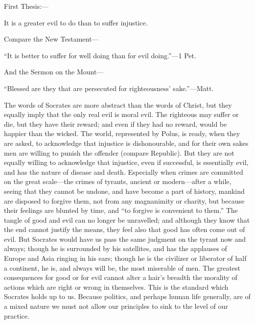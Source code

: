 \documentclass[11pt,letter]{article}
\begin{document}
\par  First Thesis:—

\par  It is a greater evil to do than to suffer injustice.

\par  Compare the New Testament—

\par  “It is better to suffer for well doing than for evil doing.”—1 Pet.

\par  And the Sermon on the Mount—

\par  “Blessed are they that are persecuted for righteousness’ sake.”—Matt.

\par  The words of Socrates are more abstract than the words of Christ, but they equally imply that the only real evil is moral evil. The righteous may suffer or die, but they have their reward; and even if they had no reward, would be happier than the wicked. The world, represented by Polus, is ready, when they are asked, to acknowledge that injustice is dishonourable, and for their own sakes men are willing to punish the offender (compare Republic). But they are not equally willing to acknowledge that injustice, even if successful, is essentially evil, and has the nature of disease and death. Especially when crimes are committed on the great scale—the crimes of tyrants, ancient or modern—after a while, seeing that they cannot be undone, and have become a part of history, mankind are disposed to forgive them, not from any magnanimity or charity, but because their feelings are blunted by time, and “to forgive is convenient to them.” The tangle of good and evil can no longer be unravelled; and although they know that the end cannot justify the means, they feel also that good has often come out of evil. But Socrates would have us pass the same judgment on the tyrant now and always; though he is surrounded by his satellites, and has the applauses of Europe and Asia ringing in his ears; though he is the civilizer or liberator of half a continent, he is, and always will be, the most miserable of men. The greatest consequences for good or for evil cannot alter a hair’s breadth the morality of actions which are right or wrong in themselves. This is the standard which Socrates holds up to us. Because politics, and perhaps human life generally, are of a mixed nature we must not allow our principles to sink to the level of our practice.
\end{document}
